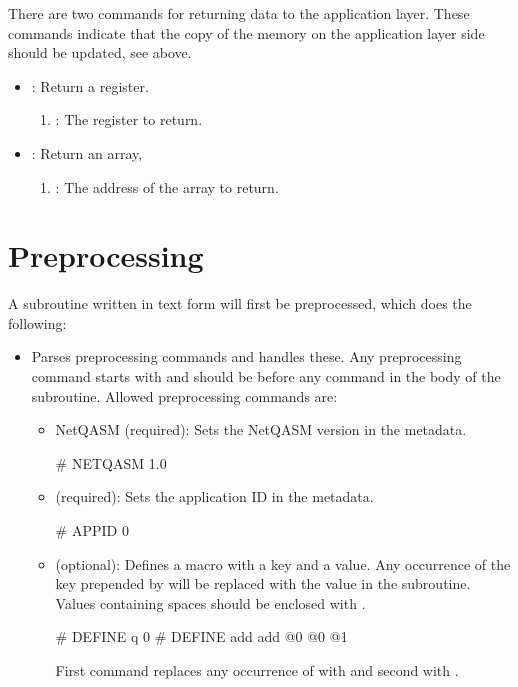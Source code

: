 There are two commands for returning data to the application layer.
These commands indicate that the copy of the memory on the application layer side should be updated, see above.
\begin{itemize}
  \item {}: Return a register.
        \begin{enumerate}
          \item \REGISTER: The register to return.
        \end{enumerate}
  \item {}: Return an array,
        \begin{enumerate}
          \item \ADDRESS: The address of the array to return.
        \end{enumerate}
\end{itemize}

\section{Preprocessing}
A subroutine written in text form will first be preprocessed, which does the following:
\begin{itemize}
  \item Parses preprocessing commands and handles these.
        Any preprocessing command starts with \nq{#} and should be before any command in the body of the subroutine.
        Allowed preprocessing commands are:
        \begin{itemize}
          \item \ac{NetQASM} (required): Sets the \ac{NetQASM} version in the metadata.
                \begin{nqcode}
# NETQASM 1.0\end{nqcode}
          \item {} (required): Sets the application ID in the metadata.
                \begin{nqcode}
# APPID 0\end{nqcode}
          \item {} (optional): Defines a macro with a key and a value.
                Any occurrence of the key prepended by \nq{\$} will be replaced with the value in the subroutine.
                Values containing spaces should be enclosed with \nq{\{\}}.

                \begin{nqcode}
# DEFINE q 0
# DEFINE add {add @0 @0 @1}\end{nqcode}
                First command replaces any occurrence of  with  and second  with .
        \end{itemize}
\end{itemize}



